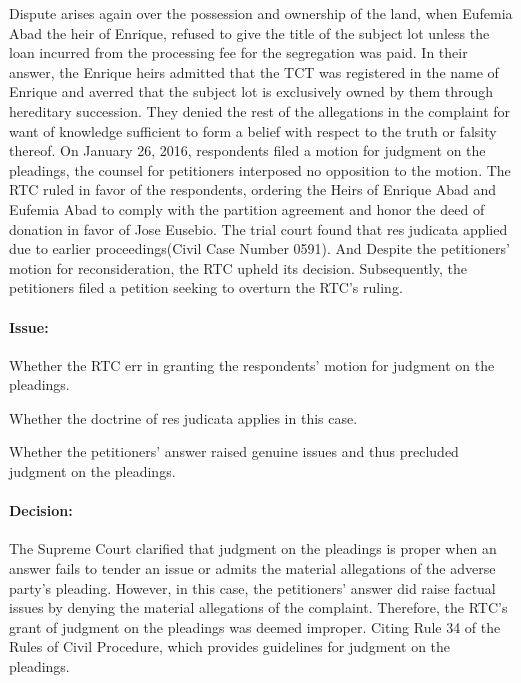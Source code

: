 \documentclass[
12pt,
oneside,
onehalfspacing,
headsepline
]{DigestCollection}
\begin{document}
Dispute arises again over the possession and ownership of the land, when Eufemia Abad the heir of Enrique, refused to give the title of the subject lot unless the loan incurred from the processing fee for the segregation was paid. In their answer, the Enrique heirs admitted that the TCT was registered in the name of Enrique and averred that the subject lot is exclusively owned by them through hereditary succession. They denied the rest of the allegations in the complaint for want of knowledge sufficient to form a belief with respect to the truth or falsity thereof. On January 26, 2016, respondents filed a motion for judgment on the pleadings, the counsel for petitioners interposed no opposition to the motion. The RTC ruled in favor of the respondents, ordering the Heirs of Enrique Abad and Eufemia Abad to comply with the partition agreement and honor the deed of donation in favor of Jose Eusebio. The trial court found that res judicata applied due to earlier proceedings(Civil Case Number 0591). And Despite the petitioners' motion for reconsideration, the RTC upheld its decision. Subsequently, the petitioners filed a petition seeking to overturn the RTC's ruling.

\paragraph{Issue:}
\label{954ee500-121a-11ef-aa24-9916ea601717}


Whether the RTC err in granting the respondents' motion for judgment on the pleadings.

Whether the doctrine of res judicata applies in this case.

Whether the petitioners' answer raised genuine issues and thus precluded judgment on the pleadings.

\paragraph{Decision:}
\label{976086f0-121a-11ef-aa24-9916ea601717}


The Supreme Court clarified that judgment on the pleadings is proper when an answer fails to tender an issue or admits the material allegations of the adverse party's pleading. However, in this case, the petitioners' answer did raise factual issues by denying the material allegations of the complaint. Therefore, the RTC's grant of judgment on the pleadings was deemed improper. Citing Rule 34 of the Rules of Civil Procedure, which provides guidelines for judgment on the pleadings.
\end{document}
